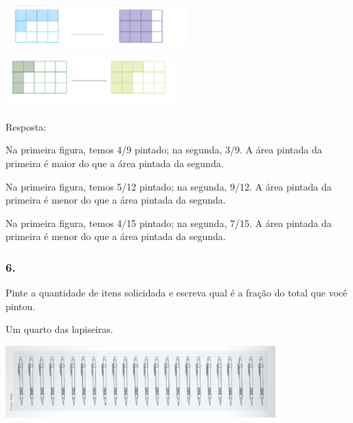 \begin{mdframed}[linewidth=2pt,linecolor=salmao,roundcorner=2pt]
\begin{escolha}
{{\begin{escolha}
\item
\end{escolha}

\includegraphics[width=2.75857in,height=0.60005in]{media/image109.png}

\begin{escolha}
\item
\end{escolha}

\includegraphics[width=2.55022in,height=0.75006in]{media/image110.png}

Resposta:

\begin{escolha}
\item
  Na primeira figura, temos 4/9 pintado; na segunda, 3/9. A
  área pintada da primeira é maior do que a área pintada da segunda.
\item
  Na primeira figura, temos 5/12 pintado; na segunda, 9/12. A área pintada da primeira é menor do que a área pintada da segunda.
\item
  Na primeira figura, temos 4/15 pintado; na segunda, 7/15. A área pintada da primeira é menor do que a área pintada da segunda.
\end{escolha}

\subsubsection{6. }

Pinte a quantidade de itens solicidada e
escreva qual é a fração do total que você pintou.

\begin{escolha}
\item
  Um quarto das lapiseiras.
\end{escolha}

\includegraphics[width=4.09202in,height=1.08343in]{media/image111.png}

}}
\end{escolha}
\end{mdframed}
